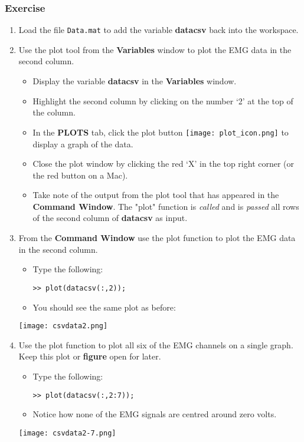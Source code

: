 \documentclass[12pt,a4paper]{article}
\begin{document}
\subsubsection*{Exercise}
\begin{enumerate}
	\item Load the file \texttt{Data.mat} to add the variable \textbf{datacsv} back into the workspace.
	\item Use the plot tool from the \textbf{Variables} window to plot the EMG data in the second column.
    	\begin{itemize}
    		\item Display the variable \textbf{datacsv} in the \textbf{Variables} window.
    		\item Highlight the second column by clicking on the number `2' at the top of the column.
    		\item In the \textbf{PLOTS} tab, click the plot button \texttt{[image: plot\_icon.png]} to display a graph of the data.
    		\item Close the plot window by clicking the red `X' in the top right corner (or the red button on a Mac).
    		\item Take note of the output from the plot tool that has appeared in the \textbf{Command Window}.	The "plot" function is \emph{called} and is \emph{passed} all rows of the second column of \textbf{datacsv} as input.	
    	\end{itemize}
	\item From the \textbf{Command Window} use the plot function to plot the EMG data in the second column.
	\begin{itemize}
		\item Type the following:
		\begin{lstlisting}[style=Matlab-editor]
>> plot(datacsv(:,2));
		\end{lstlisting}
		\item You should see the same plot as before:
	\end{itemize}
	\begin{center}
		\texttt{[image: csvdata2.png]}
	\end{center}
	\item Use the plot function to plot all six of the EMG channels on a single graph.  Keep this plot or \textbf{figure} open for later.
	\begin{itemize}
		\item Type the following:
		\begin{lstlisting}[style=Matlab-editor]
>> plot(datacsv(:,2:7));
		\end{lstlisting}		
		\item Notice how none of the EMG signals are centred around zero volts.
	\end{itemize}
	\begin{center}
		\texttt{[image: csvdata2-7.png]}
	\end{center}
\end{enumerate}
\end{document}
